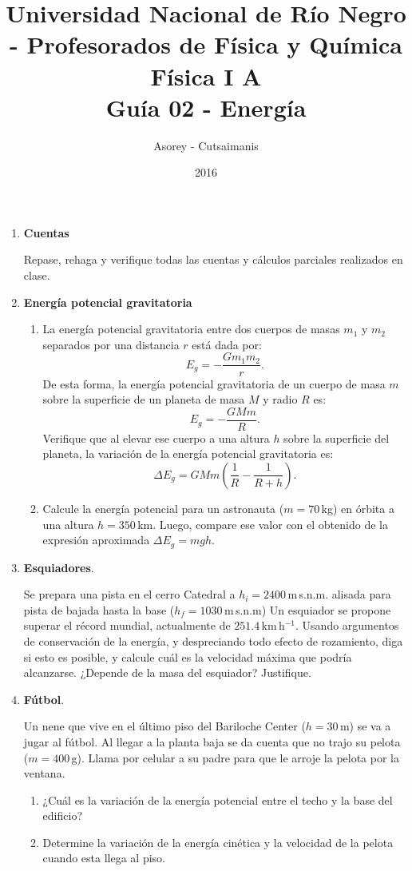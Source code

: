 \documentclass[a4paper,12pt]{article}
\begin{document}
\title{
{\normalsize{Universidad Nacional de Río Negro - Profesorados de Física y
Química}}\\
Física I A \\ Guía 02 - Energía}
\author{Asorey - Cutsaimanis}
\date{2016}
\maketitle

\begin{enumerate}

\item {\bf{Cuentas}}

Repase, rehaga y verifique todas las cuentas y cálculos parciales realizados en
clase.

\item {\bf{Energía potencial gravitatoria}}

\begin{enumerate}
\item La energía potencial gravitatoria entre dos cuerpos de masas $m_1$ y $m_2$
separados por una distancia $r$ está dada por: 
\[
E_g = -\frac{G m_1 m_2}{r}.
\]
De esta forma, la energía potencial gravitatoria de un cuerpo de masa $m$ sobre
la superficie de un planeta de masa $M$ y radio $R$ es: 
\[
E_g = -\frac{G M m}{R}.
\]
Verifique que al elevar ese cuerpo a una altura $h$ sobre la superficie del
planeta, la variación de la energía potencial gravitatoria es: 
\[
\Delta E_g = G M m \left ( \frac{1}{R} - \frac{1}{R+h} \right ).
\]
\item Calcule la energía potencial para un astronauta ($m=70$\,kg) en órbita a
una altura $h=350$\,km. Luego, compare ese valor con el obtenido de la expresión 
aproximada $\Delta E_g = m g h$.
\end{enumerate} 

\item{\bf{Esquiadores}}.

Se prepara una pista en el cerro Catedral a $h_i=2400$\,m\,s.n.m. alisada para
pista de bajada hasta la base ($h_f=1030$\,m\,s.n.m) Un esquiador se propone
superar el récord mundial, actualmente de $251.4$\,km\,h$^{-1}$. Usando
argumentos de conservación de la energía, y despreciando todo efecto de
rozamiento, diga si esto es posible, y calcule cuál es la velocidad máxima que
podría alcanzarse. ¿Depende de la masa del esquiador? Justifique.

\item{\bf{Fútbol}}.

Un nene que vive en el último piso del Bariloche Center ($h=30$\,m) se va a jugar al
fútbol. Al llegar a la planta baja se da cuenta que no trajo su pelota ($m=400$\,g). 
Llama por celular a su padre para que le arroje la pelota por la ventana.
\begin{enumerate}
\item ¿Cuál es la variación de la energía potencial entre el techo y la base
del edificio?
\item Determine la variación de la energía cinética y la velocidad de la pelota
cuando esta llega al piso.
\end{enumerate}


\end{enumerate}
\end{document}
